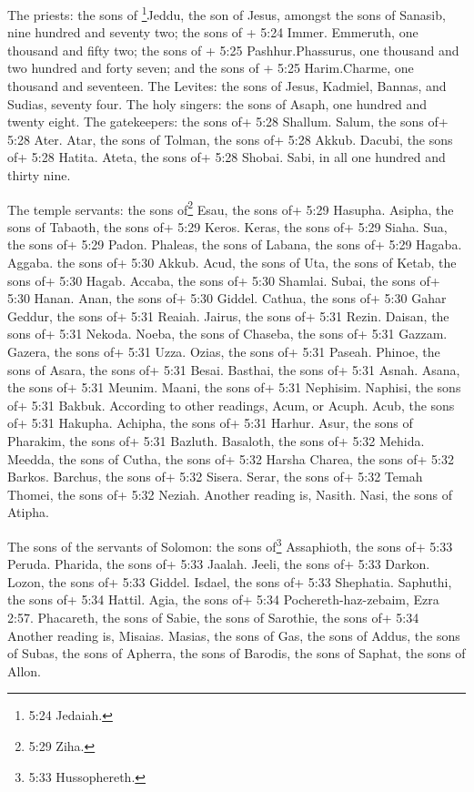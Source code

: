  The priests: the sons of \footnote{5:24 Jedaiah.}Jeddu,
the son of Jesus, amongst the sons of Sanasib, nine hundred and seventy
two; the sons of + 5:24 Immer. Emmeruth, one thousand and fifty two;
 the sons of + 5:25 Pashhur.Phassurus, one thousand and two
hundred and forty seven; and the sons of + 5:25 Harim.Charme, one
thousand and seventeen.  The Levites: the sons of Jesus,
Kadmiel, Bannas, and Sudias, seventy four.  The holy
singers: the sons of Asaph, one hundred and twenty eight. 
The gatekeepers: the sons of+ 5:28 Shallum. Salum, the sons of+ 5:28
Ater. Atar, the sons of Tolman, the sons of+ 5:28 Akkub. Dacubi, the
sons of+ 5:28 Hatita. Ateta, the sons of+ 5:28 Shobai. Sabi, in all one
hundred and thirty nine.

 The temple servants: the sons of\footnote{5:29 Ziha.}
Esau, the sons of+ 5:29 Hasupha. Asipha, the sons of Tabaoth, the sons
of+ 5:29 Keros. Keras, the sons of+ 5:29 Siaha. Sua, the sons of+ 5:29
Padon. Phaleas, the sons of Labana, the sons of+ 5:29 Hagaba. Aggaba.
 the sons of+ 5:30 Akkub. Acud, the sons of Uta, the sons
of Ketab, the sons of+ 5:30 Hagab. Accaba, the sons of+ 5:30 Shamlai.
Subai, the sons of+ 5:30 Hanan. Anan, the sons of+ 5:30 Giddel. Cathua,
the sons of+ 5:30 Gahar Geddur,  the sons of+ 5:31 Reaiah.
Jairus, the sons of+ 5:31 Rezin. Daisan, the sons of+ 5:31 Nekoda.
Noeba, the sons of Chaseba, the sons of+ 5:31 Gazzam. Gazera, the sons
of+ 5:31 Uzza. Ozias, the sons of+ 5:31 Paseah. Phinoe, the sons of
Asara, the sons of+ 5:31 Besai. Basthai, the sons of+ 5:31 Asnah. Asana,
the sons of+ 5:31 Meunim. Maani, the sons of+ 5:31 Nephisim. Naphisi,
the sons of+ 5:31 Bakbuk. According to other readings, Acum, or Acuph.
Acub, the sons of+ 5:31 Hakupha. Achipha, the sons of+ 5:31 Harhur.
Asur, the sons of Pharakim, the sons of+ 5:31 Bazluth. Basaloth,
 the sons of+ 5:32 Mehida. Meedda, the sons of Cutha, the
sons of+ 5:32 Harsha Charea, the sons of+ 5:32 Barkos. Barchus, the sons
of+ 5:32 Sisera. Serar, the sons of+ 5:32 Temah Thomei, the sons of+
5:32 Neziah. Another reading is, Nasith. Nasi, the sons of Atipha.

 The sons of the servants of Solomon: the sons
of\footnote{5:33 Hussophereth.} Assaphioth, the sons of+ 5:33 Peruda.
Pharida, the sons of+ 5:33 Jaalah. Jeeli, the sons of+ 5:33 Darkon.
Lozon, the sons of+ 5:33 Giddel. Isdael, the sons of+ 5:33 Shephatia.
Saphuthi,  the sons of+ 5:34 Hattil. Agia, the sons of+
5:34 Pochereth-haz-zebaim, Ezra 2:57. Phacareth, the sons of Sabie, the
sons of Sarothie, the sons of+ 5:34 Another reading is, Misaias. Masias,
the sons of Gas, the sons of Addus, the sons of Subas, the sons of
Apherra, the sons of Barodis, the sons of Saphat, the sons of Allon.

